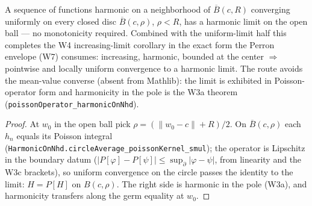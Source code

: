\begin{lemma}
\label{lem:perron-harnack-harmonic-limit}
A sequence of functions harmonic on a neighborhood of
\(\overline{B}(c, R)\) converging uniformly on every closed disc
\(\overline{B}(c, \rho)\), \(\rho < R\), has a harmonic limit on the
open ball — no monotonicity required.  Combined with the uniform-limit
half this completes the W4 increasing-limit corollary in the exact form
the Perron envelope (W7) consumes: increasing, harmonic, bounded at the
center \(\Rightarrow\) pointwise and locally uniform convergence to a
harmonic limit.  The route avoids the mean-value converse (absent from
Mathlib): the limit is exhibited in Poisson-operator form and
harmonicity in the pole is the W3a theorem
(\texttt{poissonOperator\_harmonicOnNhd}).
\leanok
\end{lemma}
\begin{proof}\leanok
At \(w_0\) in the open ball pick
\(\rho = (\lVert w_0 - c\rVert + R)/2\).  On \(\overline{B}(c, \rho)\)
each \(h_n\) equals its Poisson integral
(\texttt{HarmonicOnNhd.circleAverage\_poissonKernel\_smul}); the
operator is Lipschitz in the boundary datum
(\(|P[\varphi] - P[\psi]| \le \sup_{\partial}|\varphi - \psi|\), from
linearity and the W3c brackets), so uniform convergence on the circle
passes the identity to the limit: \(H = P[H]\) on \(B(c, \rho)\).  The
right side is harmonic in the pole (W3a), and harmonicity transfers
along the germ equality at \(w_0\).
\end{proof}

